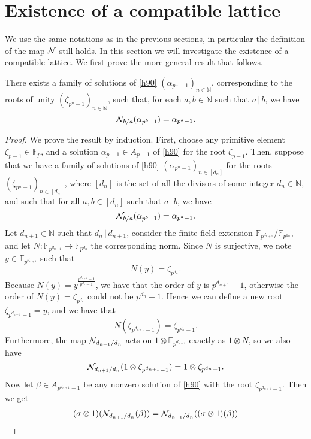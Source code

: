 \documentclass[a4paper,11pt]{article}
\begin{document}
\section{Existence of a compatible lattice}
\label{sec:existence}
We use the same notations as in the previous sections, in particular the
definition of the map $\mathcal N$ still holds. In this section we will investigate the
existence of a compatible lattice. We first prove the more general result that
follows.
\begin{prop}
  There exists a family of solutions of \eqref{h90}
  $(\alpha_{p^n-1})_{n\in\mathbb{N}}$, corresponding to the roots of unity
  $(\zeta_{p^n-1})_{n\in\mathbb{N}}$, such that, for each $a,b\in\mathbb{N}$
  such that $a\,|\,b$, we have
  \[
    \mathcal N_{b/a}(\alpha_{p^b-1})=\alpha_{p^a-1}.
  \]
\end{prop}
\begin{proof}
  We prove the result by induction. First, choose any primitive element
  $\zeta_{p-1}\in\mathbb{F}_p$, and a solution $\alpha_{p-1}\in
  A_{p-1}$ of \eqref{h90} for the root $\zeta_{p-1}$. Then, suppose that we have
  a family of solutions of \eqref{h90} $(\alpha_{p^n-1})_{n\in \left[ d_n
  \right]}$ for the roots
  $(\zeta_{p^n-1})_{n\in \left[ d_n \right]}$, where $\left[ d_n \right]$ is
  the set of all the divisors of some integer $d_n\in\mathbb{N}$, and such that for all $a,
  b\in \left[ d_n \right]$ such that $a\,|\,b$, we have
  \[
    \mathcal N_{b/a}(\alpha_{p^b-1})=\alpha_{p^a-1}.
  \]
  Let $d_{n+1}\in\mathbb{N}$ such that $d_n\,|\,d_{n+1}$, consider the
  finite field extension $\mathbb{F}_{p^{d_{n+1}}}/\mathbb{F}_{p^{d_n}}$, and
  let $N:\mathbb{F}_{p^{d_{n+1}}}\to\mathbb{F}_{p^{d_n}}$ the corresponding
  norm. Since $N$ is surjective, we note $y\in\mathbb{F}_{p^{d_{n+1}}}$ such
  that
  \[
    N(y) = \zeta_{p^{d_{n}}}.
  \]
  Because $N(y)=y^{\frac{p^{d_{n+1}}-1}{p^{d_n}-1}}$, we have that the order of
  $y$ is $p^{d_{n+1}}-1$, otherwise the order of $N(y)=\zeta_{p^{d_n}}$ could not
  be $p^{d_n}-1$. Hence we can define a new root $\zeta_{p^{d_{n+1}}-1}=y$, and we
  have that 
  \[
    N(\zeta_{p^{d_{n+1}}-1})=\zeta_{p^{d_n}-1}.
  \]
  Furthermore, the map $\mathcal N_{d_{n+1}/d_n}$ acts on
  $1\otimes\mathbb{F}_{p^{d_{n+1}}}$ exactly as $1\otimes N$, so we also have
  \[
    \mathcal N_{d_{n+1}/d_n}(1\otimes\zeta_{p^{d_{n+1}}-1}) =
    1\otimes\zeta_{p^{d_{n}}-1}.
  \]
Now let
$\beta\in A_{p^{d_{n+1}}-1}$ be any nonzero solution of \eqref{h90} with the root
$\zeta_{p^{d_{n+1}}-1}$.
Then we get
\begin{align*}
  (\sigma\otimes1)(\N_{d_{n+1}/d_{n}}(\beta)) &= \N_{d_{n+1}/d_{n}}((\sigma\otimes1)(\beta)) \\

\end{align*}
\end{proof}
\end{document}
